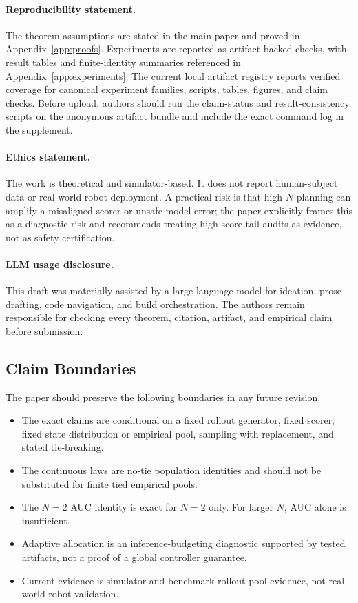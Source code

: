 \paragraph{Reproducibility statement.}
The theorem assumptions are stated in the main paper and proved in Appendix~\ref{app:proofs}. Experiments are reported as artifact-backed checks, with result tables and finite-identity summaries referenced in Appendix~\ref{app:experiments}. The current local artifact registry reports verified coverage for canonical experiment families, scripts, tables, figures, and claim checks. Before upload, authors should run the claim-status and result-consistency scripts on the anonymous artifact bundle and include the exact command log in the supplement.

\paragraph{Ethics statement.}
The work is theoretical and simulator-based. It does not report human-subject data or real-world robot deployment. A practical risk is that high-$N$ planning can amplify a misaligned scorer or unsafe model error; the paper explicitly frames this as a diagnostic risk and recommends treating high-score-tail audits as evidence, not as safety certification.

\paragraph{LLM usage disclosure.}
This draft was materially assisted by a large language model for ideation, prose drafting, code navigation, and build orchestration. The authors remain responsible for checking every theorem, citation, artifact, and empirical claim before submission.

\subsection{Claim Boundaries}
\label{app:boundaries}

The paper should preserve the following boundaries in any future revision.
\begin{itemize}
  \item The exact claims are conditional on a fixed rollout generator, fixed scorer, fixed state distribution or empirical pool, sampling with replacement, and stated tie-breaking.
  \item The continuous laws are no-tie population identities and should not be substituted for finite tied empirical pools.
  \item The $N=2$ AUC identity is exact for $N=2$ only. For larger $N$, AUC alone is insufficient.
  \item Adaptive allocation is an inference-budgeting diagnostic supported by tested artifacts, not a proof of a global controller guarantee.
  \item Current evidence is simulator and benchmark rollout-pool evidence, not real-world robot validation.
\end{itemize}
